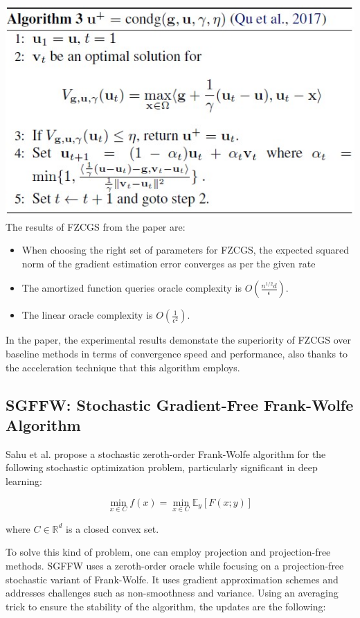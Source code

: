 \documentclass[10pt,twocolumn,letterpaper]{article}
\begin{document}
\includegraphics*[scale=0.7]{img/condg_pseudocode.jpg} \\


The results of FZCGS from the paper are:

\begin{itemize}
   \item When choosing the right set of parameters for FZCGS, the expected squared norm of the gradient estimation error converges as per the given rate
   \item The amortized function queries oracle complexity is $O\left(\frac{n^{1 / 2} d}{\epsilon}\right)$.
   \item The linear oracle complexity is $O\left(\frac{1}{\epsilon^{2}}\right)$.
\end{itemize}

In the paper, the experimental results demonstate the superiority of FZCGS over baseline methods
in terms of convergence speed and performance, also thanks to the acceleration technique that this algorithm employs.

\subsection{SGFFW: Stochastic Gradient-Free Frank-Wolfe Algorithm}

Sahu et al.\cite{Sahu} propose a stochastic zeroth-order Frank-Wolfe algorithm for the following stochastic
optimization problem, particularly significant in deep learning:

\[
\min _{x \in C} f(x)=\min _{x \in C} \mathbb{E}_{y}[F(x ; y)]
\]

where $C \in \mathbb{R}^{d}$ is a closed convex set.

To solve this kind of problem, one can employ projection and projection-free methods.
SGFFW uses a zeroth-order oracle while focusing on a projection-free stochastic variant
of Frank-Wolfe. It uses gradient approximation schemes and addresses challenges such as non-smoothness
and variance. Using an averaging trick to ensure the stability of the algorithm,
the updates are the following:
\end{document}

